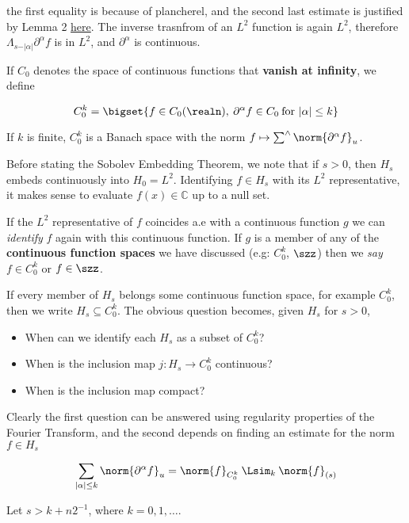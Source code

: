 the first equality is because of plancherel, and the second last
estimate is justified by Lemma 2
\href{\%7B\%7B\%20site.baseurl\%20\%7D\%7D/\%7B\%\%20post_url\%202023-08-12-folland-distribution-excerpts\%20\%\%7D\#chapter-8}{here}.
The inverse trasnfrom of an \(L^2\) function is again \(L^2\), therefore
\(\Lambda_{s-\vert\alpha\vert}\partial^\alpha f\) is in \(L^2\), and
\(\partial^\alpha\) is continuous.

If \(C_0\) denotes the space of continuous functions that \textbf{vanish
at infinity}, we define

\[
C_{0}^{k} = \bigset{f\in C_0(\realn),\: \partial^{\alpha}f \in C_0\:\text{for }\vert\alpha\vert\leq k}
\]

If \(k\) is finite, \(C_0^k\) is a Banach space with the norm
\(f\mapsto \sum^{\wedge}\norm{\partial^\alpha f}_u\).

Before stating the Sobolev Embedding Theorem, we note that if \(s>0\),
then \(H_s\) embeds continuously into \(H_0 = L^2\). Identifying
\(f\in H_s\) with its \(L^2\) representative, it makes sense to evaluate
\(f(x)\in\mathbb{C}\) up to a null set.

If the \(L^2\) representative of \(f\) coincides a.e with a continuous
function \(g\) we can \emph{identify} \(f\) again with this continuous
function. If \(g\) is a member of any of the \textbf{continuous function
spaces} we have discussed (e.g: \(C_0^k\), \(\szz\)) then we \emph{say}
\(f\in C^{k}_0\) or \(f\in \szz\).

If every member of \(H_s\) belongs some continuous function space, for
example \(C_0^k\), then we write \(H_s\subseteq C_0^k\). The obvious
question becomes, given \(H_s\) for \(s>0\),

\begin{itemize}
\tightlist
\item
  When can we identify each \(H_s\) as a subset of \(C_0^k\)?
\item
  When is the inclusion map \(j: H_s\to C_0^k\) continuous?
\item
  When is the inclusion map compact?
\end{itemize}

Clearly the first question can be answered using regularity properties
of the Fourier Transform, and the second depends on finding an estimate
for the norm \(f\in H_s\)

\[
\sum_{\vert\alpha\vert\leq k} \norm{\partial^{\alpha} f}_u= \norm{f}_{C_0^k}\: \Lsim_{k}\: \norm{f}_{(s)}
\]

Let \(s > k + n2^{-1}\), where \(k = 0, 1,\ldots\).

